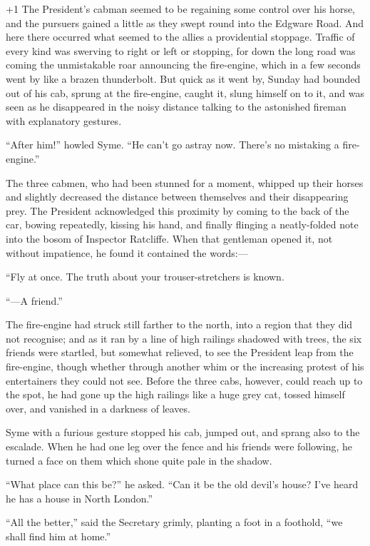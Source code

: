 \looseness+1
The President’s cabman seemed to be regaining some control over his horse, and the pursuers gained a little as they swept round into the Edgware Road. And here there occurred what seemed to the allies a providential stoppage. Traffic of every kind was swerving to right or left or stopping, for down the long road was coming the unmistakable roar announcing the fire-engine, which in a few seconds went by like a brazen thunderbolt. But quick as it went by, Sunday had bounded out of his cab, sprung at the fire-engine, caught it, slung himself on to it, and was seen as he disappeared in the noisy distance talking to the astonished fireman with explanatory gestures.

“After him!” howled Syme. “He can’t go astray now. There’s no mistaking a fire-engine.”

The three cabmen, who had been stunned for a moment, whipped up their horses and slightly decreased the distance between themselves and their disappearing prey. The President acknowledged this proximity by coming to the back of the car, bowing repeatedly, kissing his hand, and finally flinging a neatly-folded note into the bosom of Inspector Ratcliffe. When that gentleman opened it, not without impatience, he found it contained the words:⁠—

    “Fly at once. The truth about your trouser-stretchers is known.

    “⁠—A friend.”

The fire-engine had struck still farther to the north, into a region that they did not recognise; and as it ran by a line of high railings shadowed with trees, the six friends were startled, but somewhat relieved, to see the President leap from the fire-engine, though whether through another whim or the increasing protest of his entertainers they could not see. Before the three cabs, however, could reach up to the spot, he had gone up the high railings like a huge grey cat, tossed himself over, and vanished in a darkness of leaves.

Syme with a furious gesture stopped his cab, jumped out, and sprang also to the escalade. When he had one leg over the fence and his friends were following, he turned a face on them which shone quite pale in the shadow.

“What place can this be?” he asked. “Can it be the old devil’s house? I’ve heard he has a house in North London.”

“All the better,” said the Secretary grimly, planting a foot in a foothold, “we shall find him at home.”

